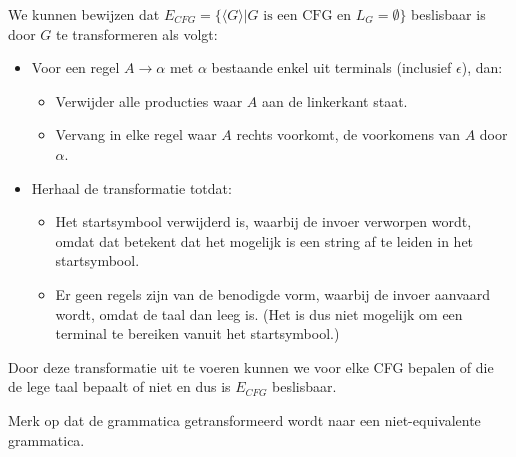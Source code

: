   We kunnen bewijzen dat $E_{CFG} = \{\langle G \rangle | G \text{ is een CFG en } L_G = \emptyset\}$ beslisbaar is door $G$ te transformeren als volgt:
  \begin{itemize}
  \item Voor een regel $A \rightarrow \alpha$ met $\alpha$ bestaande enkel uit terminals (inclusief $\epsilon$), dan:
  \begin{itemize}
  \item Verwijder alle producties waar $A$ aan de linkerkant staat.
  \item Vervang in elke regel waar $A$ rechts voorkomt, de voorkomens van $A$ door $\alpha$.
  \end{itemize}
  \item Herhaal de transformatie totdat:
  \begin{itemize}
  \item Het startsymbool verwijderd is, waarbij de invoer verworpen wordt, omdat dat betekent dat het mogelijk is een string af te leiden in het startsymbool.
  \item Er geen regels zijn van de benodigde vorm, waarbij de invoer aanvaard wordt, omdat de taal dan leeg is. (Het is dus niet mogelijk om een terminal te bereiken vanuit het startsymbool.)
  \end{itemize}
  \end{itemize}
  Door deze transformatie uit te voeren kunnen we voor elke CFG bepalen of die de lege taal bepaalt of niet en dus is $E_{CFG}$ beslisbaar.
  
  Merk op dat de grammatica getransformeerd wordt naar een niet-equivalente grammatica.